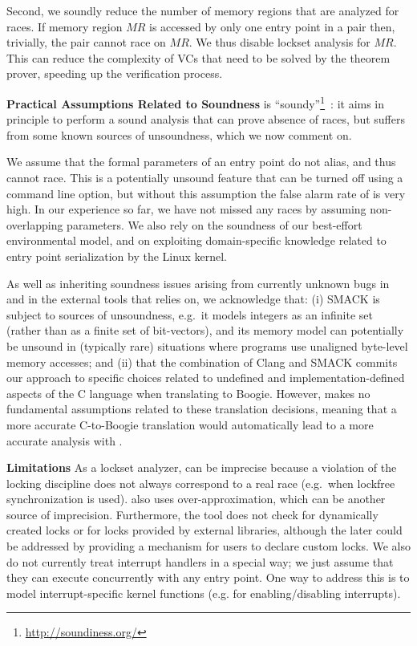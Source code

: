 Second, we soundly reduce the number of memory regions that are analyzed for races.  If memory region $\mathit{MR}$ is accessed by only one entry point in a pair then, trivially, the pair cannot race on $\mathit{MR}$.  We thus disable lockset analysis for $\mathit{MR}$.  This can reduce the complexity of VCs that need to be solved by the theorem prover, speeding up the verification process.

\noindent\textbf{Practical Assumptions Related to Soundness}
%
\whoop is ``soundy''\footnote{\url{http://soundiness.org/}}~\cite{soundiness}: it aims in principle to perform a sound analysis that can prove absence of races, but suffers from some known sources of unsoundness, which we now comment on.

We assume that the formal parameters of an entry point do not alias, and thus cannot race. This is a potentially unsound feature that can be turned off using a command line option, but without this assumption the false alarm rate of \whoop is very high. In our experience so far, we have not missed any races by assuming non-overlapping parameters.  We also rely on the soundness of our best-effort environmental model, and on exploiting domain-specific knowledge related to entry point serialization by the Linux kernel.

As well as inheriting soundness issues arising from currently unknown bugs in \whoop and in the external tools that \whoop relies on, we acknowledge that: (i) SMACK is subject to sources of unsoundness, e.g.\ it models integers as an infinite set (rather than as a finite set of bit-vectors), and its memory model can potentially be unsound in (typically rare) situations where programs use unaligned byte-level memory accesses; and (ii) that the combination of Clang and SMACK commits our approach to specific choices related to undefined and implementation-defined aspects of the C language when translating to Boogie.  However, \whoop makes no fundamental assumptions related to these translation decisions, meaning that a more accurate C-to-Boogie translation would automatically lead to a more accurate analysis with \whoop.

\noindent\textbf{Limitations }
%
As a lockset analyzer, \whoop can be imprecise because a violation of the locking discipline does not always correspond to a real race (e.g.\ when lockfree synchronization is used). \whoop also uses over-approximation, which can be another source of imprecision. Furthermore, the tool does not check for dynamically created locks or for locks provided by external libraries, although the later could be addressed by providing a mechanism for users to declare custom locks. We also do not currently treat interrupt handlers in a special way; we just assume that they can execute concurrently with any entry point. One way to address this is to model interrupt-specific kernel functions (e.g. for enabling/disabling interrupts).

